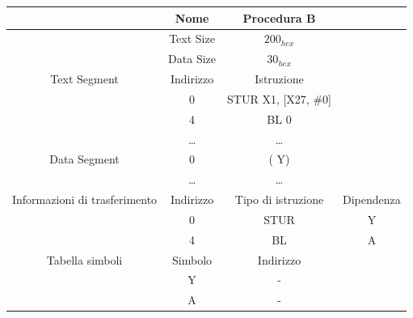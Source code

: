 \documentclass[12pt,a4paper]{article}
\begin{document}
\begin{center}
\begin{tabular}{|c|c|c|c|}
\hline
                                 & Nome                     & Procedura B                                  &                          \\ \hline
                                 & Text Size                & $200_{hex}$                                    &                          \\ \hline
                                 & Data Size                & $30_{hex}$                                     &                          \\ \hline
Text Segment                     & Indirizzo                & Istruzione                                     &                          \\ \hline
                                 & 0                        &  STUR X1, {[}X27, {\color[HTML]{3531FF}\#0{}}] &                          \\ \hline
                                 & 4                        & BL {\color[HTML]{3531FF} 0}                    &                          \\ \hline
                                 & \dots     & \dots                           &                          \\ \hline
Data Segment                     & {\color[HTML]{3531FF} 0} & ({\color[HTML]{3531FF} Y})                     &                          \\ \hline
                                 & \dots     & \dots                           &                          \\ \hline
Informazioni di trasferimento    & Indirizzo                & Tipo di istruzione                             & Dipendenza               \\ \hline
                                 & 0                        & STUR                                           & {\color[HTML]{3531FF} Y} \\ \hline
                                 & 4                        & BL                                             & {\color[HTML]{3531FF} A} \\ \hline
Tabella simboli                  & Simbolo                  & Indirizzo                                      &                          \\ \hline
                                 & {\color[HTML]{3531FF} Y} & -                                              &                          \\ \hline
                                 & {\color[HTML]{3531FF} A} & -                                              &                          \\ \hline
\end{tabular}
\end{center}
\end{document}
